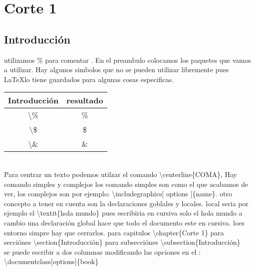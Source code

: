 \documentclass[12pt]{article}
\begin{document}
\section{Corte 1}
    \subsection{Introducción}
        utilizamos \% para comentar . En el preambulo colocamos los paquetes que vamos a utilizar.
        Hay algunos simbolos que no se pueden utilizar libremente pues \LaTeX lo tiene guardados para algunas cosas especificas.
\\
\begin{tabular}{c|c}\hline
Introducción & resultado \\ \hline \hline
\textbackslash\% & \% \\ 
\textbackslash\$ & \$ \\
\textbackslash\& & \&
\end{tabular}
\\
Para centrar un texto podemos utilzar el comando \textbackslash centerline\{COMA\}, 
Hay comando simples y complejos 
los comando simples son como el que acabamos de ver, los complejos son por ejemplo: 
\textbackslash includegraphics[ options ]\{name\}. 
otro concepto a tener en cuenta son la declaraciones goblales y locales. 
local seria por ejemplo el  \textbackslash textit\{hola mundo\} pues escribiria en cursiva solo el hola mundo 
a cambio una declaración global hace que todo el documento este en cursiva. loes entorno simpre hay que cerrarlos.
para capitulos \textbackslash chapter\{Corte 1\}
para  secciónes \textbackslash section\{Introducción\}
para subsecciónes \textbackslash subsection\{Introducción\}
\\ 
se puede escribir a dos columnas modificando las opciones en el : \textbackslash documentclass[options]\{book\}
\end{document}
